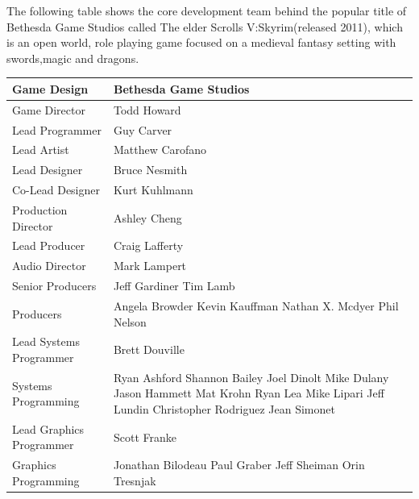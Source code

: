 \documentclass[a4paper,one side,12pt]{book}
\begin{document}
The following table shows the core development team behind the popular 
title of Bethesda Game Studios called The elder Scrolls V:Skyrim(released 2011)\cite{skyrim}, which
is an open world, role playing game focused on a medieval fantasy setting
with swords,magic and dragons. 
\begin{longtable} 
  {|m{15em} m{10em}|}
   \hline\hline
Game Design &Bethesda Game Studios\\\hline
Game Director& Todd Howard\\\hline
Lead Programmer& Guy Carver\\\hline
Lead Artist &Matthew Carofano\\\hline
Lead Designer& Bruce Nesmith\\\hline
Co-Lead Designer& Kurt Kuhlmann\\\hline
Production Director& Ashley Cheng\\\hline
Lead Producer& Craig Lafferty\\\hline
Audio Director& Mark Lampert\\\hline
Senior Producers& Jeff Gardiner\newline 
Tim Lamb\\\hline
Producers& Angela Browder\newline
Kevin Kauffman\newline
Nathan X. Mcdyer\newline
Phil Nelson\\\hline
Lead Systems Programmer& Brett Douville\\\hline
Systems Programming& Ryan Ashford\newline
Shannon Bailey\newline
Joel Dinolt\newline
Mike Dulany\newline
Jason Hammett\newline
Mat Krohn\newline
Ryan Lea\newline
Mike Lipari\newline
Jeff Lundin\newline
Christopher Rodriguez\newline
Jean Simonet\\\hline
Lead Graphics Programmer& Scott Franke\\\hline
Graphics Programming& Jonathan Bilodeau\newline
Paul Graber\newline
Jeff Sheiman\newline
Orin Tresnjak\\\hline

\end{longtable}
\end{document}
